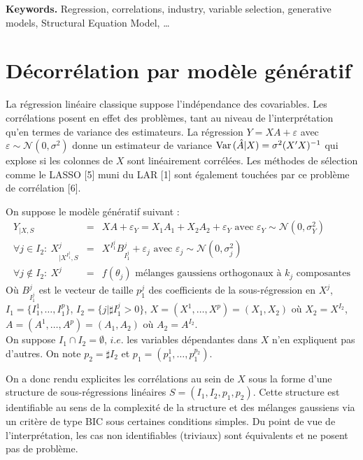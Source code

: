 \documentclass[12pt]{article}
\begin{document}
{\bf Keywords.} Regression, correlations, industry, variable selection, generative models, Structural Equation Model, \ldots


\section{Décorrélation par modèle génératif}
	La régression linéaire classique suppose l'indépendance des covariables. Les corrélations posent en effet des problèmes, tant au niveau de l'interprétation qu'en termes de variance des estimateurs. La régression $Y=XA+\varepsilon$ avec $ \varepsilon\sim \mathcal{N}(0,\sigma^2)$ donne un estimateur de variance $ {\rm Var}\,(\hat{A}|X)= \sigma^2(X'X)^{-1}$ qui explose si les colonnes de $X$ sont linéairement corrélées. Les méthodes de sélection comme le LASSO [5] muni du LAR [1] sont également touchées par ce problème de corrélation [6].
		
		On suppose le modèle génératif suivant :
	\begin{eqnarray}
	Y_{|X,S}&=&XA+\varepsilon_Y= X_1A_{1}+X_2A_{2}+\varepsilon_Y \textrm{ avec } \varepsilon_Y \sim \mathcal{N}(0,\sigma_Y^2) \label{MainR}\\
	\forall j \in I_2 : \  X^j_{|X^{I_1^j},S}&=&X^{I_1^j}B_{I_1^j}^j + \varepsilon_{j} \textrm{ avec } \varepsilon_j \sim \mathcal{N}(0,\sigma_j^2) \label{SR}\\
    \forall j \notin I_2 : \ X^j &=& f(\theta_j) \textrm{ mélanges gaussiens orthogonaux à $k_j$ composantes} 	
\end{eqnarray}
Où $B_{I_1^j}^j$ est le vecteur de taille $p_1^j$ des coefficients de la sous-régression en $X^j$,\\ $I_1=\{I_1^1,\dots,I_1^{p}\}$, $I_2=\{j |\sharp I_1^j>0 \}$, $X=(X^1,\dots,X^p)=(X_1,X_2)$ où $X_2=X^{I_2}$, $A=(A^1,\dots,A^p)=(A_1,A_2)$ où $A_2=A^{I_2}$.\\
On suppose $I_1\cap I_2=\emptyset$, $i.e.$ les variables dépendantes dans $X$ n'en expliquent pas d'autres.
On note $p_2= \sharp I_2$ et $p_1=(p_1^1,\dots,p_1^{p_2})$.
	
On a donc rendu explicites les corrélations au sein de $X$ sous la forme d'une structure de sous-régressions linéaires $S=(I_1,I_2,p_1,p_2)$.	
Cette structure est identifiable au sens de la complexité de la structure et des mélanges gaussiens via un critère de type BIC sous certaines conditions simples. Du point de vue de l'interprétation, les cas non identifiables (triviaux) sont équivalents et ne posent pas de problème.
\end{document}
